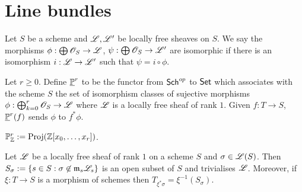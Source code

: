 \documentclass{memoir}
\begin{document}
\section{Line bundles}
\begin{definition}
    Let $S$ be a scheme and $\shf{L}, \shf{L}'$ be locally free sheaves on $S$.
    We say the morphisms $\phi:\bigoplus\shf{O}_S\to \shf{L}$, $\psi:\bigoplus\shf{O}_S\to \shf{L}'$ are isomorphic if there is an isomorphism $i:\shf{L} \to \shf{L}'$ such that $\psi = i \circ \phi$.
\end{definition}
\begin{definition}
    Let $r\ge0$.
    Define $\underline \P^r$ to be the functor from $\Sch^{op}$ to $\Set$ which associates with the scheme $S$ the set of isomorphism classes of sujective morphisms $\phi:\bigoplus_{k=0}^r\shf{O}_S\to \shf{L}$ where $\shf{L}$ is a locally free sheaf of rank $1$. 
    Given $f:T\to S$, $\underline \P^r(f)$ sends $\phi$ to $f^*\phi$.
\end{definition}
\begin{definition}
    $\P^r_\Z := \Proj(\Z[x_0,\dots,x_r])$.
\end{definition}
\begin{lemma}
    Let $\shf{L}$ be a locally free sheaf of rank $1$ on a scheme $S$ and $\sigma\in \shf{L}(S)$.
    Then $S_\sigma := \set{s\in S: \sigma\not\in \mf m_s\shf{L}_s}$ is an open subset of $S$ and trivialises $\shf{L}$.
    Moreover, if $\xi:T\to S$ is a morphism of schemes then $T_{\xi^*\sigma} = \xi^{-1}(S_\sigma)$.
\end{lemma}
\end{document}
